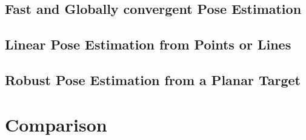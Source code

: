 \subsection{Fast and Globally convergent Pose Estimation}

\subsection{Linear Pose Estimation from Points or Lines}

\subsection{Robust Pose Estimation from a Planar Target}

\section{Comparison}

